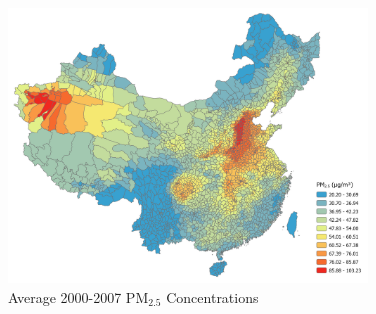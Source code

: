\documentclass[12pt]{article}
\begin{document}
\vspace{2cm}
\begin{figure}[H]
  \caption{Average 2000-2007 $\mathrm{PM_{2.5}}$ Concentrations}\label{fig:2}
  \centering \includegraphics[width=0.85\textwidth]{images_updated/pm00-07}
\end{figure}
\end{document}
